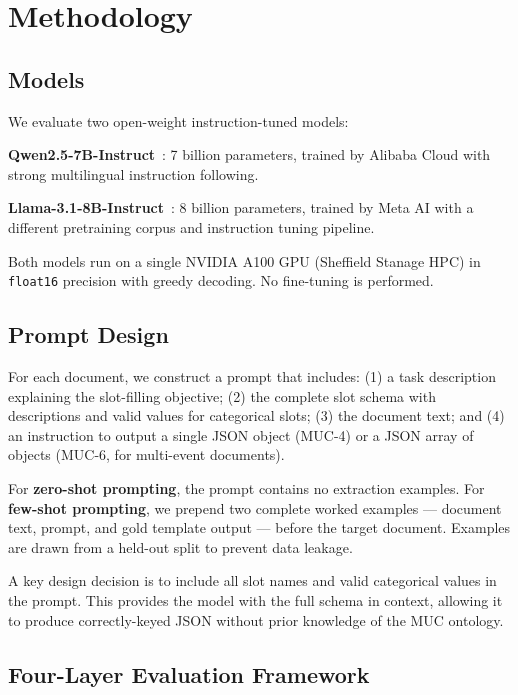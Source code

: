 \documentclass[11pt,a4paper]{article}
\begin{document}
\section{Methodology}
\label{sec:methodology}

\subsection{Models}

We evaluate two open-weight instruction-tuned models:

\textbf{Qwen2.5-7B-Instruct}~\cite{qwen2025}: 7 billion parameters, trained by Alibaba Cloud with strong multilingual instruction following.

\textbf{Llama-3.1-8B-Instruct}~\cite{llama3}: 8 billion parameters, trained by Meta AI with a different pretraining corpus and instruction tuning pipeline.

Both models run on a single NVIDIA A100 GPU (Sheffield Stanage HPC) in \texttt{float16} precision with greedy decoding. No fine-tuning is performed.

\subsection{Prompt Design}

For each document, we construct a prompt that includes: (1) a task description explaining the slot-filling objective; (2) the complete slot schema with descriptions and valid values for categorical slots; (3) the document text; and (4) an instruction to output a single JSON object (MUC-4) or a JSON array of objects (MUC-6, for multi-event documents).

For \textbf{zero-shot prompting}, the prompt contains no extraction examples. For \textbf{few-shot prompting}, we prepend two complete worked examples — document text, prompt, and gold template output — before the target document. Examples are drawn from a held-out split to prevent data leakage.

A key design decision is to include all slot names and valid categorical values in the prompt. This provides the model with the full schema in context, allowing it to produce correctly-keyed JSON without prior knowledge of the MUC ontology.

\subsection{Four-Layer Evaluation Framework}
\end{document}
